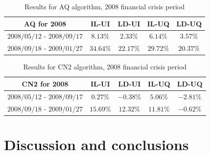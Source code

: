 \documentclass[preprint,3p,twocolumn]{elsarticle}
\begin{document}
\begin{center}
\begin{table}[t]
\centering
\begin{tabular}{ccccc}
\hline
\textbf{AQ for 2008} & \textbf{IL-UI} & \textbf{LD-UI} & \textbf{IL-UQ} & \textbf{LD-UQ} \\
\hline
$2008/05/12$ - $2008/09/17$ & $8.13\%$ & $2.33\%$ & $6.14\%$ & $3.57\%$ \\
$2008/09/18$ - $2009/01/27$ & $34.64\%$ & $22.17\%$ & $29.72\%$ & $20.37	\%$  \\
\hline
\end{tabular}
\caption{\label{table:AQ results for 2008} Results for AQ algorithm, 2008 financial crisis period}
\end{table}
\end{center}

\begin{center}
\begin{table}[t]
\centering
\begin{tabular}{ccccc}
\hline
\textbf{CN2 for 2008} & \textbf{IL-UI} & \textbf{LD-UI} & \textbf{IL-UQ} & \textbf{LD-UQ} \\
\hline
$2008/05/12$ - $2008/09/17$ & $0.27\%$ & $-0.38\%$ & $5.06\%$ & $-2.81\%$ \\
$2008/09/18$ - $2009/01/27$ & $15.69\%$ & $12.32\%$ & $11.81\%$ & $-0.62\%$  \\
\hline
\end{tabular}
\caption{\label{table:CN2 results for 2008} Results for CN2 algorithm, 2008 financial crisis period}
\end{table}
\end{center}

\section{Discussion and conclusions}
\label{sec:conclusions}



\end{document}
